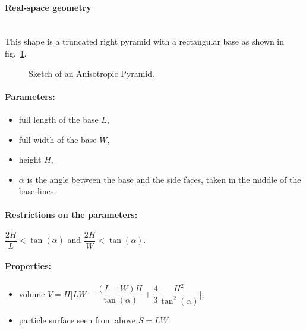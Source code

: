 \paragraph{Real-space geometry}\mbox{}\\
This shape is a truncated right pyramid with a rectangular base as
shown in fig.~\ref{fig:anisopyramid}.

\begin{figure}[ht]
\hfill
{}
\hfill
{}
\hfill
\caption{Sketch of an Anisotropic Pyramid.}
\label{fig:anisopyramid}
\end{figure}

\FloatBarrier

\paragraph{Parameters:}
\begin{itemize}
\item full length of the base $L$,
\item full width of the base $W$,
\item height $H$,
\item $\alpha$ is the angle between the base and the
  side faces, taken in the middle of the base lines.
\end{itemize}

\paragraph{Restrictions on the parameters:} $\dfrac{2H}{L}< \tan(\alpha)$ and $\dfrac{2H}{W}< \tan(\alpha)$.

\paragraph{Properties:}
\begin{itemize}
\item volume $V= H \Big[LW - \dfrac{(L + W)H}{\tan(\alpha)}
   + \dfrac{4}{3} \dfrac{H^2}{\tan^2(\alpha)}\Big]$,
\item particle surface seen from above $S = LW$.
\end{itemize}

